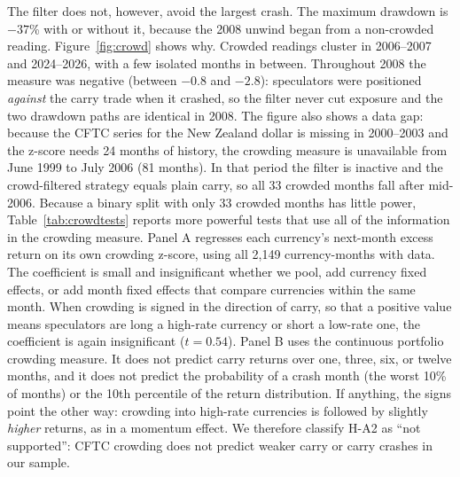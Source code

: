 \documentclass[11pt]{article}
\begin{document}
The filter does not, however, avoid the largest crash. The maximum drawdown is $-37$\% with or without it, because the 2008 unwind began from a non-crowded reading. Figure~\ref{fig:crowd} shows why. Crowded readings cluster in 2006--2007 and 2024--2026, with a few isolated months in between. Throughout 2008 the measure was negative (between $-0.8$ and $-2.8$): speculators were positioned \emph{against} the carry trade when it crashed, so the filter never cut exposure and the two drawdown paths are identical in 2008. The figure also shows a data gap: because the CFTC series for the New Zealand dollar is missing in 2000--2003 and the z-score needs 24 months of history, the crowding measure is unavailable from June 1999 to July 2006 (81 months). In that period the filter is inactive and the crowd-filtered strategy equals plain carry, so all 33 crowded months fall after mid-2006. Because a binary split with only 33 crowded months has little power, Table~\ref{tab:crowdtests} reports more powerful tests that use all of the information in the crowding measure. Panel A regresses each currency's next-month excess return on its own crowding z-score, using all 2,149 currency-months with data. The coefficient is small and insignificant whether we pool, add currency fixed effects, or add month fixed effects that compare currencies within the same month. When crowding is signed in the direction of carry, so that a positive value means speculators are long a high-rate currency or short a low-rate one, the coefficient is again insignificant ($t=0.54$). Panel B uses the continuous portfolio crowding measure. It does not predict carry returns over one, three, six, or twelve months, and it does not predict the probability of a crash month (the worst 10\% of months) or the 10th percentile of the return distribution. If anything, the signs point the other way: crowding into high-rate currencies is followed by slightly \emph{higher} returns, as in a momentum effect. We therefore classify H-A2 as ``not supported'': CFTC crowding does not predict weaker carry or carry crashes in our sample.
\end{document}
